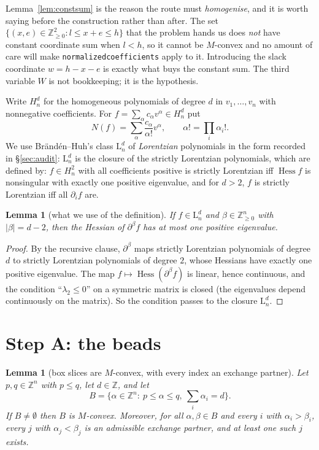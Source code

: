 \documentclass[11pt]{article}
\theoremstyle{plain}
\newtheorem{lemma}[theorem]{Lemma}
\theoremstyle{definition}
\DeclareMathOperator{\Hess}{Hess}
\newcommand{\Z}{\mathbb{Z}}
\begin{document}
Lemma~\ref{lem:constsum} is the reason the route must \emph{homogenise}, and it is worth
saying before the construction rather than after. The set
$\{(x,e)\in\Z_{\ge0}^{2}:l\le x+e\le h\}$ that the problem hands us does \emph{not} have
constant coordinate sum when $l<h$, so it cannot be $M$-convex and no amount of care will
make \texttt{normalizedcoefficients} apply to it. Introducing the slack coordinate
$w=h-x-e$ is exactly what buys the constant sum. The third variable $W$ is not
bookkeeping; it is the hypothesis.

Write $H^d_n$ for the homogeneous polynomials of degree $d$ in $v_1,\dots,v_n$ with
nonnegative coefficients. For $f=\sum_\alpha c_\alpha v^\alpha\in H^d_n$ put
\[
  N(f)=\sum_\alpha\frac{c_\alpha}{\alpha!}v^\alpha,\qquad \alpha!=\prod_i\alpha_i! .
\]
We use Brändén--Huh's class $\mathrm L^d_n$ of \emph{Lorentzian} polynomials in the form
recorded in \S\ref{sec:audit}: $\mathrm L^d_n$ is the closure of the strictly Lorentzian
polynomials, which are defined by: $f\in H^2_n$ with all coefficients positive is strictly
Lorentzian iff $\Hess f$ is nonsingular with exactly one positive eigenvalue, and for
$d>2$, $f$ is strictly Lorentzian iff all $\partial_if$ are.

\begin{lemma}[what we use of the definition]\label{lem:defuse}
If $f\in\mathrm L^d_n$ and $\beta\in\Z_{\ge0}^n$ with $|\beta|=d-2$, then the Hessian of
$\partial^\beta f$ has at most one positive eigenvalue.
\end{lemma}

\begin{proof}
By the recursive clause, $\partial^\beta$ maps strictly Lorentzian polynomials of degree
$d$ to strictly Lorentzian polynomials of degree $2$, whose Hessians have exactly one
positive eigenvalue. The map $f\mapsto\Hess(\partial^\beta f)$ is linear, hence continuous,
and the condition ``$\lambda_2\le0$'' on a symmetric matrix is closed (the eigenvalues
depend continuously on the matrix). So the condition passes to the closure
$\mathrm L^d_n$.
\end{proof}

\section{Step A: the beads}

\begin{lemma}[box slices are $M$-convex, with every index an exchange partner]\label{lem:boxslice}
Let $p,q\in\Z^n$ with $p\le q$, let $d\in\Z$, and let
\[
  B=\{\alpha\in\Z^n:\ p\le\alpha\le q,\ \textstyle\sum_i\alpha_i=d\}.
\]
If $B\ne\emptyset$ then $B$ is $M$-convex. Moreover, for all $\alpha,\beta\in B$ and every
$i$ with $\alpha_i>\beta_i$, \emph{every} $j$ with $\alpha_j<\beta_j$ is an admissible
exchange partner, and at least one such $j$ exists.
\end{lemma}
\end{document}

